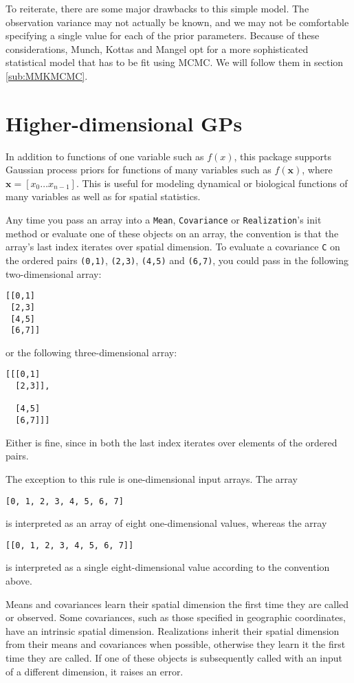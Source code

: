 \documentclass{manual}
\begin{document}
To reiterate, there are some major drawbacks to this simple model. The observation variance may not actually be known, and we may not be comfortable specifying a single value for each of the prior parameters. Because of these considerations, Munch, Kottas and Mangel opt for a more sophisticated statistical model that has to be fit using MCMC. We will follow them in section \ref{sub:MMKMCMC}. 

\section{Higher-dimensional GPs}\label{sec:highdim} 

In addition to functions of one variable such as $f(x)$, this package supports Gaussian process priors for functions of many variables such as $f(\mathbf{x})$, where $\mathbf{x}=[x_0\ldots x_{n-1}]$. This is useful for modeling dynamical or biological functions of many variables as well as for spatial statistics.

Any time you pass an array into a \texttt{Mean}, \texttt{Covariance} or \texttt{Realization}'s init method or evaluate one of these objects on an array, the convention is that the array's last index iterates over spatial dimension. To evaluate a covariance \texttt{C} on the ordered pairs \texttt{(0,1)}, \texttt{(2,3)}, \texttt{(4,5)} and \texttt{(6,7)}, you could pass in the following two-dimensional array:
\begin{verbatim}
[[0,1]
 [2,3]
 [4,5]
 [6,7]]
\end{verbatim}
or the following three-dimensional array:
\begin{verbatim}
[[[0,1]
  [2,3]],

  [4,5]
  [6,7]]]
\end{verbatim}
Either is fine, since in both the last index iterates over elements of the ordered pairs.

The exception to this rule is one-dimensional input arrays. The array
\begin{verbatim}
[0, 1, 2, 3, 4, 5, 6, 7]
\end{verbatim}
is interpreted as an array of eight one-dimensional values, whereas the array
\begin{verbatim}
[[0, 1, 2, 3, 4, 5, 6, 7]]
\end{verbatim}
is interpreted as a single eight-dimensional value according to the convention above.

Means and covariances learn their spatial dimension the first time they are called or observed. Some covariances, such as those specified in geographic coordinates, have an intrinsic spatial dimension. Realizations inherit their spatial dimension from their means and covariances when possible, otherwise they learn it the first time they are called. If one of these objects is subsequently called with an input of a different dimension, it raises an error.
\end{document}
